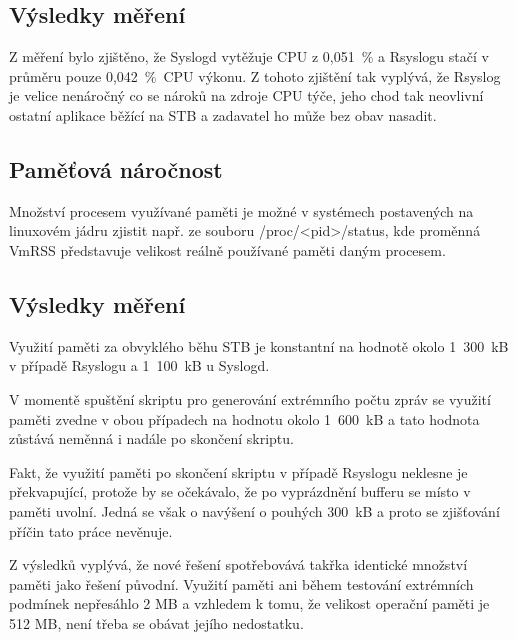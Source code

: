 \documentclass[thesis=B,czech]{FITthesis}[2012/06/26]
\begin{document}
\subsection*{Výsledky měření}
Z měření bylo zjištěno, že Syslogd vytěžuje CPU z 0,051~\% a Rsyslogu stačí v průměru pouze 0,042~\%~CPU výkonu. Z tohoto zjištění tak vyplývá, že Rsyslog je velice nenáročný co se nároků na zdroje CPU týče, jeho chod tak neovlivní ostatní aplikace běžící na STB a zadavatel ho může bez obav nasadit.

\subsection{Paměťová náročnost}
Množství procesem využívané paměti je možné v systémech postavených na linuxovém jádru zjistit např. ze souboru /proc/<pid>/status, kde proměnná VmRSS představuje velikost reálně používané paměti daným procesem.

\subsection*{Výsledky měření}
Využití paměti za obvyklého běhu STB je konstantní na hodnotě okolo 1~300~kB v případě Rsyslogu a 1~100~kB u Syslogd.

V momentě spuštění skriptu pro generování extrémního počtu zpráv se využití paměti zvedne v obou případech na hodnotu okolo 1~600~kB a tato hodnota zůstává neměnná i nadále po skončení skriptu.

 Fakt, že využití paměti po skončení skriptu v případě Rsyslogu neklesne je překvapující, protože by se očekávalo, že po vyprázdnění bufferu se místo v paměti uvolní. Jedná se však o navýšení o pouhých 300~kB a proto se zjišťování příčin tato práce nevěnuje.

Z výsledků vyplývá, že nové řešení spotřebovává takřka identické množství paměti jako řešení původní. Využití paměti ani během testování extrémních podmínek nepřesáhlo 2 MB a vzhledem k tomu, že velikost operační paměti je 512 MB, není třeba se obávat jejího nedostatku.
\end{document}
